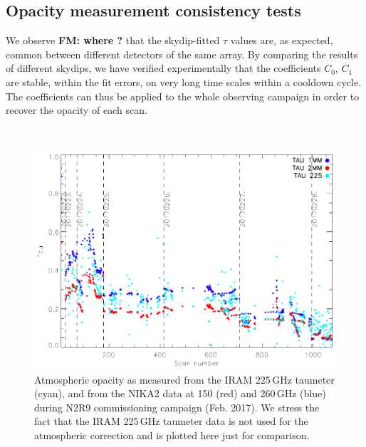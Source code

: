 \subsection{Opacity measurement consistency tests}


We observe {\bf FM: where ?} that the skydip-fitted $\tau$ values are, as expected,
common between different detectors of the same array. By comparing
the results of different skydips, we have verified experimentally
that the coefficients $C_0$, $C_1$ are stable, within the fit
errors, on very long time scales within a cooldown cycle. The
coefficients can thus be applied to the whole observing campaign
in order to recover the opacity of each scan.


\\


\begin{figure}[ht]
\begin{center}
\includegraphics[scale=0.8]{../../Paper_NIKA2_Technical/opacity_evol_run22.pdf}
\caption{Atmospheric opacity as measured from the IRAM 225\,GHz taumeter (cyan), and from the NIKA2 data at 150 (red) and 260\,GHz (blue) during 
  N2R9 commissioning campaign (Feb. 2017). We stress the fact that the IRAM 225\,GHz taumeter data is not used for the atmospheric correction and is plotted here just for comparison.
  \label{fig:taumeas_paper}}
\end{center}
\end{figure}



